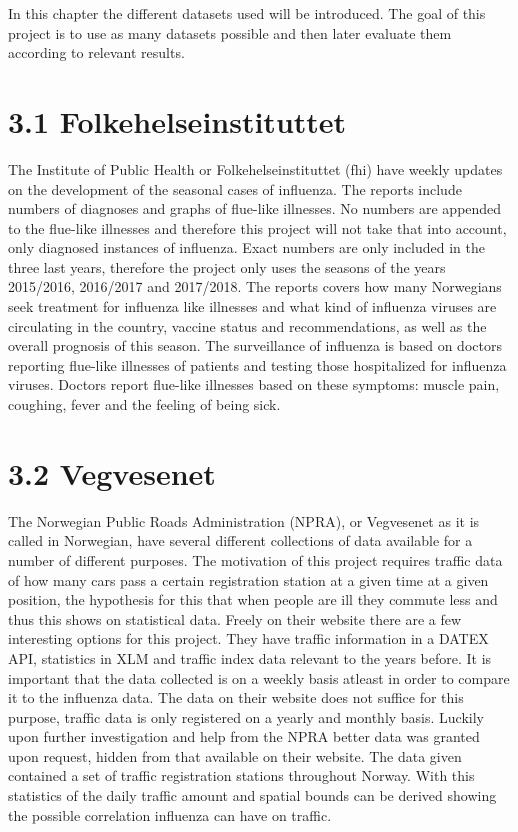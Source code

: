 In this chapter the different datasets used will be introduced. The goal of this project is to use as many datasets possible and then later evaluate them according to relevant results.

\section*{3.1 Folkehelseinstituttet}
The Institute of Public Health or Folkehelseinstituttet (fhi) have weekly updates\cite{fhi} on the development of the seasonal cases of influenza. The reports include numbers of diagnoses and graphs of flue-like illnesses. No numbers are appended to the flue-like illnesses and therefore this project will not take that into account, only diagnosed instances of influenza. Exact numbers are only included in the three last years, therefore the project only uses the seasons of the years 2015/2016, 2016/2017 and 2017/2018. The reports covers how many Norwegians seek treatment for influenza like illnesses and what kind of influenza viruses are circulating in the country, vaccine status and recommendations, as well as the overall prognosis of this season. The surveillance of influenza is based on doctors reporting flue-like illnesses of patients and testing those hospitalized for influenza viruses. Doctors report flue-like illnesses based on these symptoms: muscle pain, coughing, fever and the feeling of being sick.

\section*{3.2 Vegvesenet}
The Norwegian Public Roads Administration (NPRA), or Vegvesenet as it is called in Norwegian, have several different collections of data available for a number of different purposes. The motivation of this project requires traffic data of how many cars pass a certain registration station at a given time at a given position, the hypothesis for this that when people are ill they commute less and thus this shows on statistical data. Freely on their website \cite{vegvesenet} there are a few interesting options for this project. They have traffic information in a DATEX API, statistics in XLM and traffic index data relevant to the years before. It is important that the data collected is on a weekly basis atleast in order to compare it to the influenza data. The data on their website does not suffice for this purpose, traffic data is only registered on a yearly and monthly basis. Luckily upon further investigation and help from the NPRA better data was granted upon request, hidden from that available on their website. The data given contained a set of traffic registration stations throughout Norway. With this statistics of the daily traffic amount and spatial bounds can be derived showing the possible correlation influenza can have on traffic.

